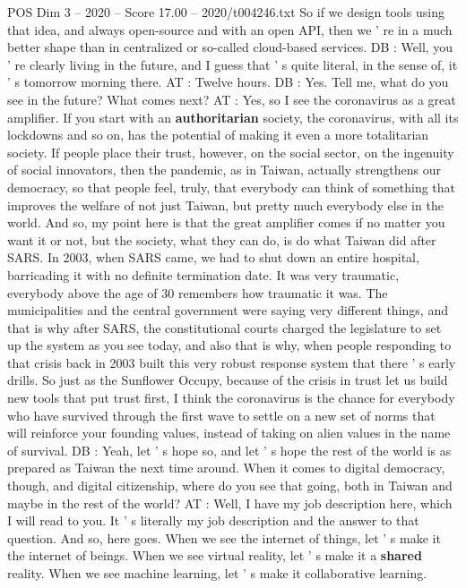 \begin{textsample}{POS Dim 3 – 2020 – Score 17.00 – 2020/t004246.txt}
So if we design tools using that idea, and always open-source and with an open API, then we ' re in a much better shape than in centralized or so-called cloud-based services.
DB : Well, you ' re clearly living in the future, and I guess that ' s quite literal, in the sense of, it ' s tomorrow morning there.
AT : Twelve hours.
DB : Yes.
Tell me, what do you see in the future?
What comes next?
AT : Yes, so I see the coronavirus as a great amplifier.
If you start with an \textbf{authoritarian} society, the coronavirus, with all its lockdowns and so on, has the potential of making it even a more totalitarian society.
If people place their trust, however, on the social sector, on the ingenuity of social innovators, then the pandemic, as in Taiwan, actually strengthens our democracy, so that people feel, truly, that everybody can think of something that improves the welfare of not just Taiwan, but pretty much everybody else in the world.
And so, my point here is that the great amplifier comes if no matter you want it or not, but the society, what they can do, is do what Taiwan did after SARS.
In 2003, when SARS came, we had to shut down an entire hospital, barricading it with no definite termination date.
It was very traumatic, everybody above the age of 30 remembers how traumatic it was.
The municipalities and the central government were saying very different things, and that is why after SARS, the constitutional courts charged the legislature to set up the system as you see today, and also that is why, when people responding to that crisis back in 2003 built this very robust response system that there ' s early drills.
So just as the Sunflower Occupy, because of the crisis in trust let us build new tools that put trust first, I think the coronavirus is the chance for everybody who have survived through the first wave to settle on a new set of norms that will reinforce your founding values, instead of taking on alien values in the name of survival.
DB : Yeah, let ' s hope so, and let ' s hope the rest of the world is as prepared as Taiwan the next time around.
When it comes to digital democracy, though, and digital citizenship, where do you see that going, both in Taiwan and maybe in the rest of the world?
AT : Well, I have my job description here, which I will read to you.
It ' s literally my job description and the answer to that question.
And so, here goes.
When we see the internet of things, let ' s make it the internet of beings.
When we see virtual reality, let ' s make it a \textbf{shared} reality.
When we see machine learning, let ' s make it collaborative learning.

\end{textsample}
